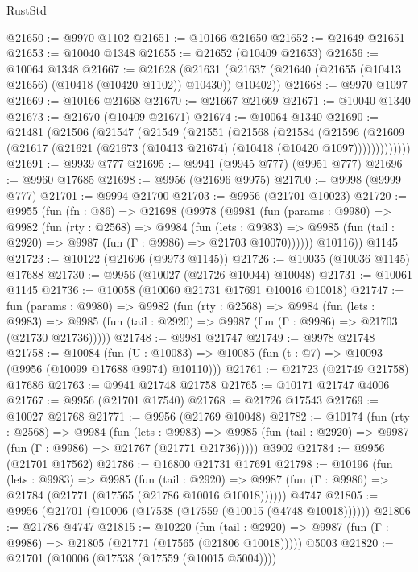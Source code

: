 \begin{lexlean}{RustStd}
\begin{coremodule}
@21650 := @9970 @1102
@21651 := @10166 @21650
@21652 := @21649 @21651
@21653 := @10040 @1348
@21655 := @21652 (@10409 @21653)
@21656 := @10064 @1348
@21667 := @21628
    (@21631 (@21637 (@21640 (@21655 (@10413 @21656) (@10418 (@10420 @1102)) @10430)) @10402))
@21668 := @9970 @1097
@21669 := @10166 @21668
@21670 := @21667 @21669
@21671 := @10040 @1340
@21673 := @21670 (@10409 @21671)
@21674 := @10064 @1340
@21690 := @21481
    (@21506
      (@21547
        (@21549
          (@21551
            (@21568
              (@21584
                (@21596
                  (@21609 (@21617 (@21621 (@21673 (@10413 @21674) (@10418 (@10420 @1097)))))))))))))
@21691 := @9939 @777
@21695 := @9941 (@9945 @777) (@9951 @777)
@21696 := @9960 @17685
@21698 := @9956 (@21696 @9975)
@21700 := @9998 (@9999 @777)
@21701 := @9994 @21700
@21703 := @9956 (@21701 @10023)
@21720 := @9955
    (fun (fn : @86) =>
    @21698
      (@9978
        (@9981
          (fun (params : @9980) =>
          @9982
            (fun (rty : @2568) =>
            @9984
              (fun (lets : @9983) =>
              @9985 (fun (tail : @2920) => @9987 (fun (Γ : @9986) => @21703 @10070))))))
        @10116))
    @1145
@21723 := @10122 (@21696 (@9973 @1145))
@21726 := @10035 (@10036 @1145) @17688
@21730 := @9956 (@10027 (@21726 @10044) @10048)
@21731 := @10061 @1145
@21736 := @10058 (@10060 @21731 @17691 @10016 @10018)
@21747 := fun (params : @9980) =>
  @9982
    (fun (rty : @2568) =>
    @9984
      (fun (lets : @9983) =>
      @9985 (fun (tail : @2920) => @9987 (fun (Γ : @9986) => @21703 (@21730 @21736)))))
@21748 := @9981 @21747
@21749 := @9978 @21748
@21758 := @10084
    (fun (U : @10083) => @10085 (fun (t : @7) => @10093 (@9956 (@10099 @17688 @9974) @10110)))
@21761 := @21723 (@21749 @21758) @17686
@21763 := @9941 @21748 @21758
@21765 := @10171 @21747 @4006
@21767 := @9956 (@21701 @17540)
@21768 := @21726 @17543
@21769 := @10027 @21768
@21771 := @9956 (@21769 @10048)
@21782 := @10174
    (fun (rty : @2568) =>
    @9984
      (fun (lets : @9983) =>
      @9985 (fun (tail : @2920) => @9987 (fun (Γ : @9986) => @21767 (@21771 @21736)))))
    @3902
@21784 := @9956 (@21701 @17562)
@21786 := @16800 @21731 @17691
@21798 := @10196
    (fun (lets : @9983) =>
    @9985
      (fun (tail : @2920) =>
      @9987 (fun (Γ : @9986) => @21784 (@21771 (@17565 (@21786 @10016 @10018))))))
    @4747
@21805 := @9956 (@21701 (@10006 (@17538 (@17559 (@10015 (@4748 @10018))))))
@21806 := @21786 @4747
@21815 := @10220
    (fun (tail : @2920) => @9987 (fun (Γ : @9986) => @21805 (@21771 (@17565 (@21806 @10018)))))
    @5003
@21820 := @21701 (@10006 (@17538 (@17559 (@10015 @5004))))

\end{coremodule}
\end{lexlean}
